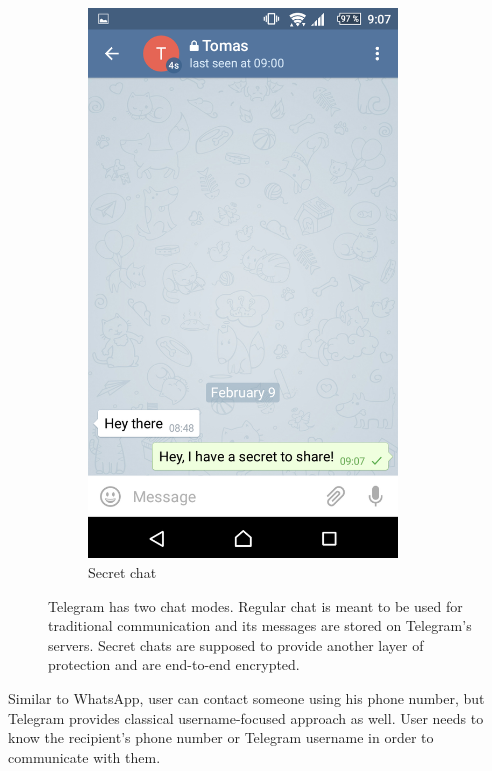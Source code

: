 \documentclass[thesis=M,english]{FITthesis}[2012/10/20]
\begin{document}
\begin{figure}[htb]
\begin{subfigure}[b]{0.4\textwidth}
		\includegraphics[width=0.9\textwidth]{telegram-secret.png}
		\caption{Secret chat}
		\label{img:telegram:secret}
	\end{subfigure}
	\caption[Telegram chat modes]{Telegram has two chat modes. Regular chat is meant to be used for traditional communication and its messages are stored on Telegram's servers. Secret chats are supposed to provide another layer of protection and are end-to-end encrypted.}
\end{figure}

Similar to WhatsApp, user can contact someone using his phone number, but Telegram provides classical username-focused approach as well. User needs to know the recipient's phone number or Telegram username in order to communicate with them.
\end{document}
